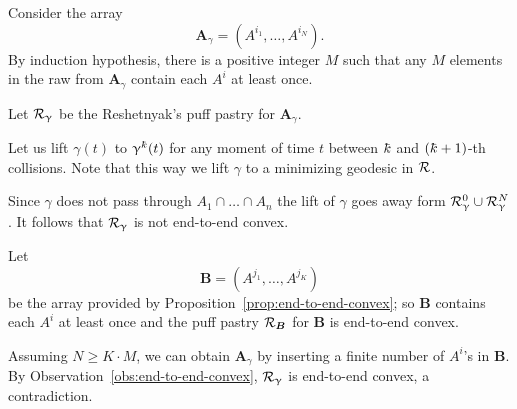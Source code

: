 Consider the array 
\[\bm{A}_\gamma=(A^{i_1},\dots,A^{i_N}).\]
By induction hypothesis, 
there is a positive integer $M$ 
such that any $M$ elements in the raw from  $\bm{A}_\gamma$ contain each $A^i$ at least once.

Let $\mathcal{R}_\upgamma$ be  the  Reshetnyak's puff pastry for  $\bm{A}_\gamma$.

Let us lift $\gamma(t)$ to $\gamma^\kay(t)$ 
for any moment of time $t$ between $\kay$ and $(\kay+1)$-th collisions.
Note that this way we lift $\gamma$ to a minimizing geodesic in $\mathcal{R}$.

Since $\gamma$ does not pass through $A_1\cap\dots\cap A_n$
the lift of $\gamma$ goes away form $\spc{R}_\gamma^0\cup \spc{R}_\gamma^N$.
It follows that $\mathcal{R}_\upgamma$ is not end-to-end convex.

Let 
\[\bm{B}=(A^{j_1},\dots,A^{j_K})\] 
be the array provided by Proposition~\ref{prop:end-to-end-convex};
so $\bm{B}$ contains each $A^i$ at least once
and the puff pastry $\mathcal{R}_{\bm{B}}$ for $\bm{B}$ is end-to-end convex.

Assuming $N\ge K\cdot M$,
we can obtain $\bm{A}_\gamma$  
by inserting a finite number of $A^i$'s in $\bm{B}$.
By Observation~\ref{obs:end-to-end-convex}, 
$\mathcal{R}_\upgamma$ is end-to-end convex,
a contradiction.
\qeds
